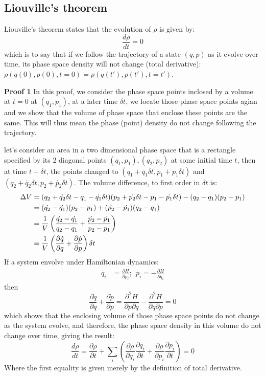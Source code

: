 \documentclass{article}
\begin{document}
\subsection{Liouville's theorem}
Liouville's theorem states that the evolution of $\rho$ is given by:
\begin{equation}
    \frac{d\rho}{dt} = 0
\end{equation}
which is to say that if we follow the trajectory of a state $(q,p)$ as it 
evolve over time, its phase space density will not change (total derivative): $\rho(q(0),p(0),t=0) = \rho(q(t'),p(t'), t = t')$. 

\textbf{Proof 1} In this proof, we consider the phase space points inclosed by a volume at $t = 0$ at $(q_1,p_1)$, at a later time $\delta t$, 
we locate those phase space points agian and we show that the volume of phase space that enclose these points are the same. This will
thus mean the phase (point) density do not change following the trajectory.

let's consider an area in a two dimensional phase space that is a rectangle specified by its 2 diagonal points $(q_1,p_1),(q_2,p_2)$ at some 
initial time $t$, then at time $t+\delta t$, the points changed to $(q_1 + \dot{q_1}\delta t, p_1 + \dot{p_1}\delta t)$ and 
$(q_2 + \dot{q_2}\delta t, p_2 + \dot{p_2}\delta t)$. The volume difference, to first order in $\delta t$ is:
\begin{align}
    \Delta V &= (q_2 + \dot{q_2}\delta t - q_1 - \dot{q_1}\delta t)(p_2 + \dot{p_2}\delta t - p_1 - \dot{p_1}\delta t) - (q_2 - q_1)(p_2 - p_1) \notag \\
             &= (\dot{q_2} - \dot{q_1}) (p_2 - p_1) + (\dot{p_2} - \dot{p_1}) (q_2 - q_1) \notag \\
             &= \frac{1}{V} \left( \frac{\dot{q_2} - \dot{q_1}}{q_2-q_1} + \frac{\dot{p_2} - \dot{p_1}}{p_2-p_1} \right) \notag \\
             &= \frac{1}{V} \left( \frac{\partial \dot{q}}{\partial q} + \frac{\partial \dot{p}}{\partial p} \right) \delta t
\end{align} 
If a system envolve under Hamiltonian dynamics:
\begin{align}
    \dot{q_i} &= \frac{\partial H}{\partial p_i} ; \ \ \dot{p_i} = -\frac{\partial H}{\partial q_i}
\end{align}
then 
\begin{equation}
    \frac{\partial \dot{q}}{\partial q} + \frac{\partial \dot{p}}{\partial p} 
    = \frac{\partial^2 H}{\partial p \partial q} - \frac{\partial^2 H}{\partial q\partial p} = 0
\end{equation}
which shows that the enclosing volume of those phase space points do not change as the system evolve, and therefore, the phase space density
in this volume do not change over time, giving the result:
\begin{equation}
    \frac{d\rho}{dt} = \frac{\partial \rho}{\partial t} + 
        \sum_i \left( \frac{\partial \rho}{\partial q_i}\frac{\partial q_i}{\partial t} + \frac{\partial \rho}{\partial p_i}\frac{\partial p_i}{\partial t} \right)
        = 0
\end{equation}
Where the first equality is given merely by the definition of total derivative.
\end{document}

